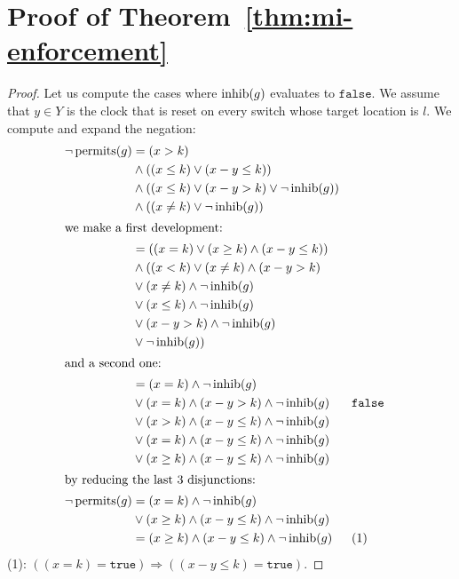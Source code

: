 
\section{Proof of Theorem~\ref{thm:mi-enforcement}}


\begin{proof}
Let us compute the cases where $\operatorname{inhib}(g)$ evaluates to $\mathtt{false}$. We assume that $y \in Y$ is the clock that is reset on every switch whose target location is $l$. We compute and expand the negation:
\begin{align*}
    \neg\operatorname{permits}(g) & = (x > k) \\
    & \wedge ((x \leq k) \vee (x - y \leq k)) \\
    & \wedge ((x \leq k) \vee (x - y > k) \vee \neg\operatorname{inhib}(g)) \\
    & \wedge ((x \neq k) \vee \neg\operatorname{inhib}(g)) \\  
   \intertext{we make a first development:}
    & = ((x = k) \vee (x \geq k) \wedge (x - y \leq k)) \\
    & \wedge ((x < k) \vee (x \neq k) \wedge (x - y > k) \\
    & \vee (x \neq k) \wedge \neg\operatorname{inhib}(g) \\
    & \vee (x \leq k) \wedge \neg\operatorname{inhib}(g) \\
    & \vee (x - y > k) \wedge \neg\operatorname{inhib}(g) \\
    & \vee \neg\operatorname{inhib}(g)) \\
    \intertext{and a second one:}
    & = (x = k) \wedge \neg\operatorname{inhib}(g) \\
    & \vee (x = k) \wedge (x - y > k) \wedge \neg\operatorname{inhib}(g) && \text{\texttt{false}} \\
    & \vee (x > k) \wedge (x - y \leq k) \wedge \neg\operatorname{inhib}(g) \\
    & \vee (x = k) \wedge (x - y \leq k) \wedge \neg\operatorname{inhib}(g) \\
    & \vee (x \geq k) \wedge (x - y \leq k) \wedge \neg\operatorname{inhib}(g) \\
    \intertext{by reducing the last 3 disjunctions:}
    \neg\operatorname{permits}(g) & = (x = k) \wedge \neg\operatorname{inhib}(g) \\
    & \vee (x \geq k) \wedge (x - y \leq k) \wedge \neg\operatorname{inhib}(g) \\
    & = (x \geq k) \wedge (x - y \leq k) \wedge \neg\operatorname{inhib}(g) && \text{(1)}
\end{align*}
(1): $((x = k) = \mathtt{true}) \Longrightarrow ((x - y \leq k) = \mathtt{true})$.


\end{proof}
